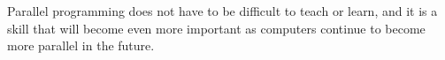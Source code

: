 \documentclass{sig-alternate}
\begin{document}
Parallel programming does not have to be difficult to teach or learn,
and it is a skill that will become even more important as computers continue to become more
parallel in the future.


%
\small{

}
%
%
\end{document}

